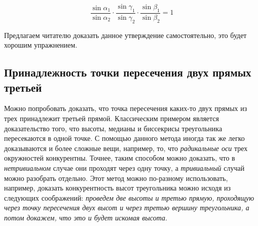 \documentclass[14pt]{extarticle}
\begin{document}
{\setlength{\mathindent}{2.5cm}
\begin{equation*}
\dfrac{\sin \alpha_1}{\sin \alpha_2} \cdot 
	\dfrac{\sin \gamma_1}{\sin \gamma_2} 
\cdot \dfrac{\sin \beta_1}{\sin \beta_2} = 1 
\end{equation*}}
	


Предлагаем читателю доказать данное  утверждение самостоятельно, это 
будет хорошим упражнением.

\subsection{Принадлежность точки пересечения двух прямых третьей}

\begin{figure}

\vspace{0cm}
\vspace{-1cm}
\end{figure}

Можно попробовать доказать, что точка пересечения каких-то двух прямых из трех
принадлежит третьей прямой. Классическим примером является доказательство
того, что высоты, медианы и биссекрисы треугольника пересекаются в одной точке.
С помощью данного метода иногда так же легко доказываются и более сложные вещи,
например, то, что \textit{радикальные оси} трех окружностей конкурентны. 
Точнее, таким способом можно доказать, что в \textit{нетривиальном} случае они 
проходят через одну точку, а \textit{тривиальный} случай можно разобрать
отдельно. Этот метод можно по-разному использовать, например, доказать
конкурентность высот треугольника можно исходя из следующих соображений: 
\textit{проведем две высоты и третью прямую, проходящую через точку пересечения
двух высот и через третью вершину треугольника, а потом докажем, что это и будет
искомая высота}.
\end{document}
